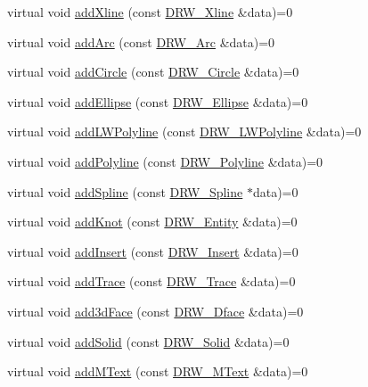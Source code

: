 \begin{DoxyCompactItemize}
\item 
virtual void \hyperlink{classDRW__Interface_a5cb4ece224c8006de498eb60e354ee9a}{add\-Xline} (const \hyperlink{classDRW__Xline}{D\-R\-W\-\_\-\-Xline} \&data)=0
\item 
virtual void \hyperlink{classDRW__Interface_a7abe9b6b69b8239fbad804eb68b0463e}{add\-Arc} (const \hyperlink{classDRW__Arc}{D\-R\-W\-\_\-\-Arc} \&data)=0
\item 
virtual void \hyperlink{classDRW__Interface_a921046eb1a06ad4753b9aaae9518af73}{add\-Circle} (const \hyperlink{classDRW__Circle}{D\-R\-W\-\_\-\-Circle} \&data)=0
\item 
virtual void \hyperlink{classDRW__Interface_a8a4d9d0ded98a7fa9ba5dd6d0005a491}{add\-Ellipse} (const \hyperlink{classDRW__Ellipse}{D\-R\-W\-\_\-\-Ellipse} \&data)=0
\item 
virtual void \hyperlink{classDRW__Interface_a14ec6d00f6f34857b91543497d9d4e09}{add\-L\-W\-Polyline} (const \hyperlink{classDRW__LWPolyline}{D\-R\-W\-\_\-\-L\-W\-Polyline} \&data)=0
\item 
virtual void \hyperlink{classDRW__Interface_a9e2c6ab12b71e73ab443765a5a42d171}{add\-Polyline} (const \hyperlink{classDRW__Polyline}{D\-R\-W\-\_\-\-Polyline} \&data)=0
\item 
virtual void \hyperlink{classDRW__Interface_a72d1cd0692fb061ea34ea246c54156ad}{add\-Spline} (const \hyperlink{classDRW__Spline}{D\-R\-W\-\_\-\-Spline} $\ast$data)=0
\item 
virtual void \hyperlink{classDRW__Interface_a6e19d01637ff9336bcd513511ba1177c}{add\-Knot} (const \hyperlink{classDRW__Entity}{D\-R\-W\-\_\-\-Entity} \&data)=0
\item 
virtual void \hyperlink{classDRW__Interface_a2aae96a5a0f5305d2e1f3254c871d2fc}{add\-Insert} (const \hyperlink{classDRW__Insert}{D\-R\-W\-\_\-\-Insert} \&data)=0
\item 
virtual void \hyperlink{classDRW__Interface_a3e09cf10863708e1ca74b2f723dc98a2}{add\-Trace} (const \hyperlink{classDRW__Trace}{D\-R\-W\-\_\-\-Trace} \&data)=0
\item 
virtual void \hyperlink{classDRW__Interface_a1664ed6d78dda11cf323776f594413fb}{add3d\-Face} (const \hyperlink{classDRW__3Dface}{D\-R\-W\-\_\-Dface} \&data)=0
\item 
virtual void \hyperlink{classDRW__Interface_a1d50d3aae16fb70d997b82f1bf2cbb4f}{add\-Solid} (const \hyperlink{classDRW__Solid}{D\-R\-W\-\_\-\-Solid} \&data)=0
\item 
virtual void \hyperlink{classDRW__Interface_a2a9e71a0794a3f8f5191bd9bc9e51bad}{add\-M\-Text} (const \hyperlink{classDRW__MText}{D\-R\-W\-\_\-\-M\-Text} \&data)=0

\end{DoxyCompactItemize}
